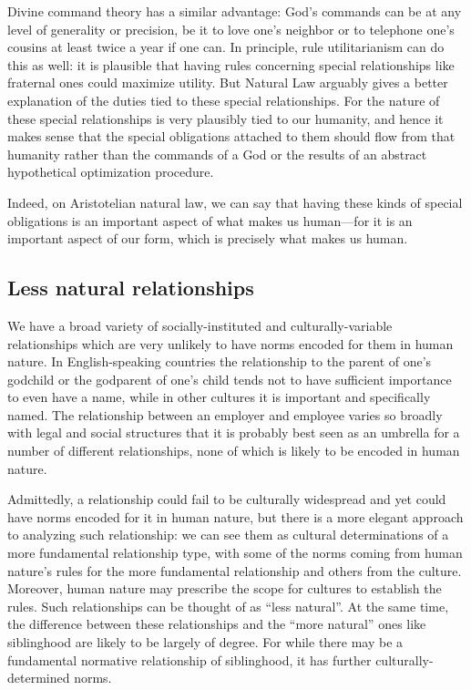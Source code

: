 Divine command theory has a similar advantage: God's commands can be at any level of generality or precision, be it to love one's neighbor or to telephone one's cousins
at least twice a year if one can. In principle, rule utilitarianism can do this as well: it is plausible that having rules concerning special relationships like
fraternal ones could maximize utility. But Natural Law arguably gives a better explanation of the duties tied to these special relationships. For the nature of these
special relationships is very plausibly tied to our humanity, and hence it makes sense that the special obligations attached to them should flow from that humanity
rather than the commands of a God or the results of an abstract hypothetical optimization procedure.

Indeed, on Aristotelian natural law, we can say that having these kinds of special obligations is an important aspect of what makes us human---for it is an important
aspect of our form, which is precisely what makes us human.

\subsection{Less natural relationships}
We have a broad variety of socially-instituted and culturally-variable relationships which are very unlikely to have norms encoded
for them in human nature.  In English-speaking countries the relationship to the  parent of one's godchild or the godparent of one's child
tends not to have sufficient importance to even have a name, while in other cultures it is important and specifically named. The relationship
between an employer and employee varies so broadly with legal and social structures that it is probably best seen as an umbrella for a number
of different relationships, none of which is likely to be encoded in human nature.

Admittedly, a relationship could fail to be culturally widespread and yet could have norms encoded for it in human nature, but there is a more elegant approach to
analyzing such relationship: we can see them as cultural determinations of a more fundamental relationship type, with some of the norms coming from human nature's
rules for the more fundamental relationship and others from the culture. Moreover, human nature may prescribe the scope for cultures to establish the rules.
Such relationships can be thought of as ``less natural''. At the same time, the difference between these relationships and the ``more natural'' ones like siblinghood
are likely to be largely of degree. For while there may be a fundamental normative relationship of siblinghood, it has further culturally-determined
norms.

